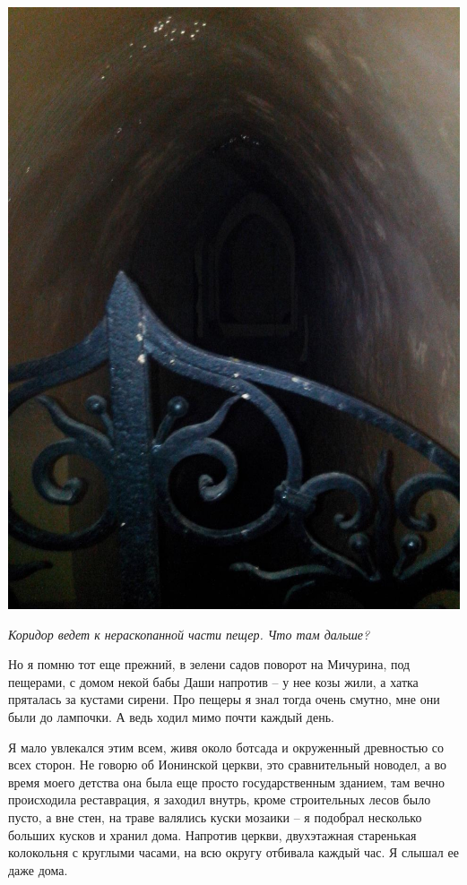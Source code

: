 \begin{center}
\includegraphics[width=\linewidth]{chast-colebanie-osnov/nachalo/IMG_20170626_135548.jpg}

\textit{Коридор ведет к нераскопанной части пещер. Что там дальше?}
\end{center}
\vspace*{\fill}
\newpage

Но я помню тот еще прежний, в зелени садов поворот на Мичурина, под пещерами, с домом некой бабы Даши напротив – у нее козы жили, а хатка пряталась за кустами сирени. Про пещеры я знал тогда очень смутно, мне они были до лампочки. А ведь ходил мимо почти каждый день.

Я мало увлекался этим всем, живя около ботсада и окруженный древностью со всех сторон. Не говорю об Ионинской церкви, это сравнительный новодел, а во время моего детства она была еще просто государственным зданием, там вечно происходила реставрация, я заходил внутрь, кроме строительных лесов было пусто, а вне стен, на траве валялись куски мозаики – я подобрал несколько больших кусков и хранил дома. Напротив церкви, двухэтажная старенькая колокольня с круглыми часами, на всю округу отбивала каждый час. Я слышал ее даже дома.

